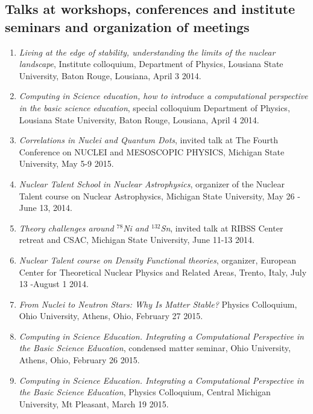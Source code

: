 \documentclass[prc,amsart,english,twocolumn,superscriptaddress,showpacs,floatfix]{revtex4}
\begin{document}
 \subsection*{Talks at workshops, conferences and institute seminars and organization of meetings}
\begin{enumerate}

\item
{\em Living at the edge of stability, understanding the limits of the nuclear landscape}, Institute colloquium, Department of Physics, Lousiana State University, Baton Rouge, Lousiana, April 3 2014.

\item
{\em Computing in Science education, how to introduce a computational perspective in the basic science education}, special colloquium Department of Physics, Lousiana State University, Baton Rouge, Lousiana, April 4 2014.
 
\item 
{\em Correlations in Nuclei and Quantum Dots}, invited talk at  The Fourth Conference on NUCLEI and MESOSCOPIC PHYSICS, Michigan State University, May 5-9 2015.

\item 
{\em Nuclear Talent School in Nuclear Astrophysics}, organizer of the Nuclear Talent course on Nuclear Astrophysics, 
Michigan State University, May 26 - June 13, 2014. 

\item
{\em Theory challenges around $^{78}$Ni and $^{132}$Sn}, invited talk at  RIBSS Center retreat and CSAC, Michigan State University, June 11-13 2014.


\item 
{\em Nuclear Talent course on Density Functional theories}, organizer, European Center for Theoretical Nuclear Physics and Related Areas, Trento, Italy, July 13 -August 1 2014.
\item {\em From Nuclei to Neutron Stars: Why Is Matter Stable?} Physics Colloquium, Ohio University, Athens, Ohio,  February 27 2015.

\item {\em Computing in Science Education.  Integrating a Computational Perspective in the Basic Science Education}, condensed matter seminar, Ohio University, Athens, Ohio,  February 26 2015.

\item {\em Computing in Science Education.  Integrating a Computational Perspective in the Basic Science Education}, Physics Colloquium, Central Michigan University, Mt Pleasant, March 19 2015.


\end{enumerate}
\end{document}
